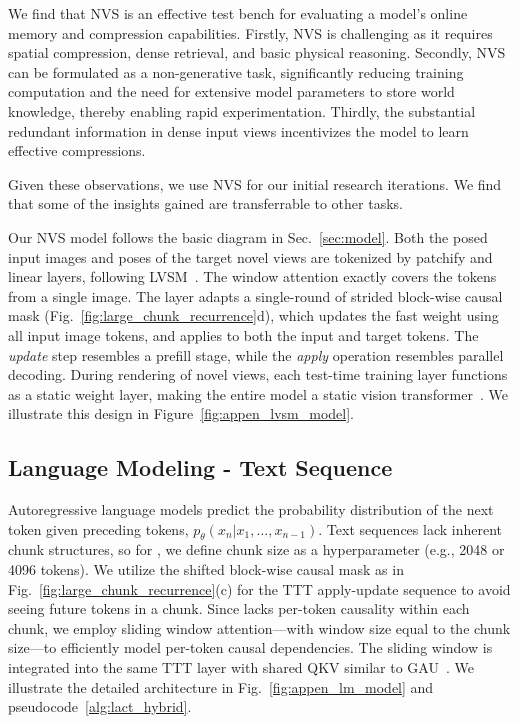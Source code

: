\documentclass{article}
\begin{document}
We find that NVS is an effective test bench 
for evaluating a model's online memory and compression capabilities. 
Firstly, NVS is
challenging as it requires spatial compression, dense retrieval, and basic physical reasoning.
Secondly, NVS can be formulated as a non-generative task, significantly reducing training computation and the need for extensive model parameters to store world knowledge, thereby enabling rapid experimentation.
Thirdly, the substantial redundant information in dense input views incentivizes the model to learn effective compressions.

Given these observations, we use NVS for our initial research iterations. We find that some of the insights gained are transferrable to other tasks.

Our NVS model follows the basic \methodname{} diagram in Sec.~\ref{sec:model}.
Both the posed input images and poses of the target novel views are tokenized by patchify and linear layers, following LVSM~\cite{jin2024lvsm}.
The window attention exactly covers the tokens from a single image.
The \methodname{} layer adapts a single-round of strided block-wise causal mask (Fig.~\ref{fig:large_chunk_recurrence}d), which updates the fast weight using all input image tokens, and applies to both the input and target tokens. The \textit{update} step resembles a prefill stage,  while the \textit{apply} operation resembles parallel decoding. During rendering of novel views, each test-time training layer functions as a static weight layer, making the entire model a static vision transformer~\cite{dosovitskiy2020image}. We illustrate this design in Figure~\ref{fig:appen_lvsm_model}.

\subsection{Language Modeling - Text Sequence}
\label{sec:method-lm}

 Autoregressive language models predict the probability distribution of the next token given preceding tokens, $p_{\theta}(x_n|x_1, \dots, x_{n-1})$.  Text sequences lack inherent chunk structures, so for \methodname{}, we define chunk size as a hyperparameter (e.g., 2048 or 4096 tokens).  We utilize the shifted block-wise causal mask as in Fig.~\ref{fig:large_chunk_recurrence}(c) for the TTT apply-update sequence  to avoid seeing future tokens in a chunk.
 Since \methodname{} lacks per-token causality within each chunk, we employ sliding window attention—with window size equal to the chunk size—to efficiently model per-token causal dependencies. The sliding window is integrated into the same TTT layer with shared QKV similar to GAU~\cite{hua2022transformer}. We illustrate the detailed architecture in Fig.~\ref{fig:appen_lm_model} and pseudocode~\ref{alg:lact_hybrid}.
\end{document}
